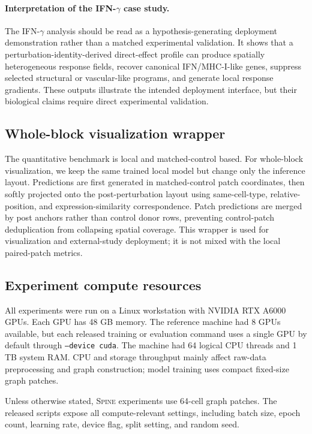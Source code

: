\documentclass[sigconf,anonymous,review]{acmart}
\newcommand{\methodname}{\textsc{Spine}\xspace}
\begin{document}
\paragraph{Interpretation of the IFN-$\gamma$ case study.}
The IFN-$\gamma$ analysis should be read as a hypothesis-generating deployment demonstration rather than a matched experimental validation. It shows that a perturbation-identity-derived direct-effect profile can produce spatially heterogeneous response fields, recover canonical IFN/MHC-I-like genes, suppress selected structural or vascular-like programs, and generate local response gradients. These outputs illustrate the intended deployment interface, but their biological claims require direct experimental validation.

\subsection{Whole-block visualization wrapper}
\label{app:whole_block_wrapper}

The quantitative benchmark is local and matched-control based. For whole-block visualization, we keep the same trained local model but change only the inference layout. Predictions are first generated in matched-control patch coordinates, then softly projected onto the post-perturbation layout using same-cell-type, relative-position, and expression-similarity correspondence. Patch predictions are merged by post anchors rather than control donor rows, preventing control-patch deduplication from collapsing spatial coverage. This wrapper is used for visualization and external-study deployment; it is not mixed with the local paired-patch metrics.


\subsection{Experiment compute resources}
\label{app:compute_resources}

All experiments were run on a Linux workstation with NVIDIA RTX A6000 GPUs. Each GPU has 48 GB memory. The reference machine had 8 GPUs available, but each released training or evaluation command uses a single GPU by default through \texttt{--device cuda}. The machine had 64 logical CPU threads and 1 TB system RAM. CPU and storage throughput mainly affect raw-data preprocessing and graph construction; model training uses compact fixed-size graph patches.

Unless otherwise stated, \methodname{} experiments use 64-cell graph patches. The released scripts expose all compute-relevant settings, including batch size, epoch count, learning rate, device flag, split setting, and random seed.
\end{document}
